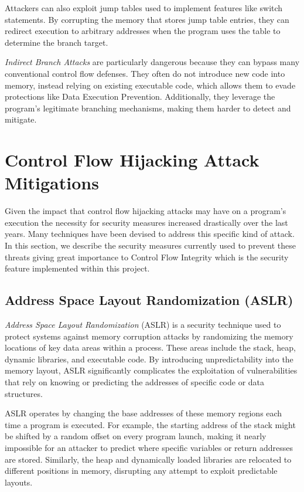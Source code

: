 Attackers can also exploit jump tables used to implement features like switch statements.
By corrupting the memory that stores jump table entries, they can redirect execution
to arbitrary addresses when the program uses the table to determine the branch target.

\textit{Indirect Branch Attacks} are particularly dangerous because they can
bypass many conventional control flow defenses. They often do not introduce new code
into memory, instead relying on existing executable code, which allows them to evade
protections like Data Execution Prevention. Additionally, they leverage the program's
legitimate branching mechanisms, making them harder to detect and mitigate.

\section{Control Flow Hijacking Attack Mitigations}
\label{sec:background_mitigation}

Given the impact that control flow hijacking attacks may have on a program's execution
the necessity for security measures increased drastically over the last years.
Many techniques have been devised to address this specific kind of attack. In this
section, we describe the security measures currently used to prevent these
threats giving great importance to Control Flow Integrity which is the security
feature implemented within this project.

\subsection{Address Space Layout Randomization (ASLR)}
\label{subsec:background_aslr}

\textit{Address Space Layout Randomization} (ASLR) is a security technique used
to protect systems against memory corruption attacks by randomizing the memory
locations of key data areas within a process. These areas include the stack,
heap, dynamic libraries, and executable code. By introducing unpredictability into
the memory layout, ASLR significantly complicates the exploitation of
vulnerabilities that rely on knowing or predicting the addresses of specific
code or data structures.

ASLR operates by changing the base addresses of these memory regions each time a
program is executed. For example, the starting address of the stack might be
shifted by a random offset on every program launch, making it nearly impossible for
an attacker to predict where specific variables or return addresses are stored.
Similarly, the heap and dynamically loaded libraries are relocated to different positions
in memory, disrupting any attempt to exploit predictable layouts.

